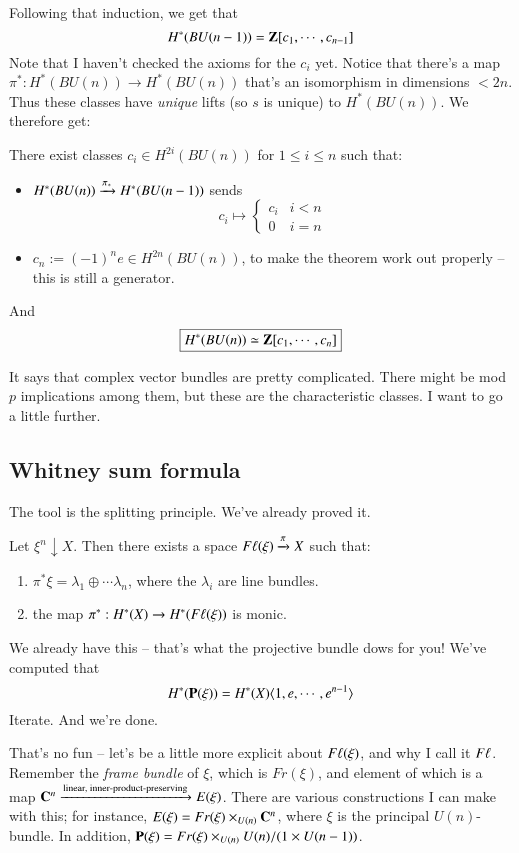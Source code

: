 Following that induction, we get that
$$
H^\ast(BU(n-1)) = \mathbf Z[c_1,\cdots,c_{n-1}]
$$
Note that I haven't checked the axioms for the $c_i$ yet.
Notice that there's a map $\pi^\ast:H^\ast(BU(n)) \to H^\ast(BU(n))$ that's an isomorphism in dimensions $<2n$.
Thus these classes have \emph{unique} lifts (so $s$ is unique) to $H^\ast(BU(n))$.
We therefore get:
\begin{theorem}
    There exist classes $c_i\in H^{2i}(BU(n))$ for $1\leq i\leq n$ such that:
    \begin{itemize}
	\item $H^\ast(BU(n)) \xrightarrow{{\pi_\ast}} H^\ast(BU(n-1))$ sends
	    $$
	    c_i \mapsto \begin{cases}
		c_i & i<n\\
		0 & i=n
	    \end{cases}
	    $$
	\item $c_n := (-1)^n e\in H^{2n}(BU(n))$, to make the theorem work out properly -- this is still a generator.
    \end{itemize}
    And
    $$
    \boxed{H^\ast(BU(n)) \simeq \mathbf Z[c_1,\cdots,c_n]}
    $$
\end{theorem}
It says that complex vector bundles are pretty complicated.
There might be mod $p$ implications among them, but these are the characteristic classes.
I want to go a little further.
\subsection{Whitney sum formula}
The tool is the splitting principle.
We've already proved it.
\begin{theorem}
    Let $\xi^n\downarrow X$.
    Then there exists a space $F\ell(\xi) \xrightarrow{{\pi}} X$ such that:
    \begin{enumerate}
	\item $\pi^\ast \xi = \lambda_1\oplus\cdots\lambda_n$, where the $\lambda_i$ are line bundles.
	\item the map $\pi^\ast: H^\ast(X) \to H^\ast(F\ell(\xi))$ is monic.
    \end{enumerate}
\end{theorem}
We already have this -- that's what the projective bundle dows for you!
We've computed that
$$
H^\ast(\mathbf P(\xi)) = H^\ast(X)\langle 1,e,\cdots,e^{n-1}\rangle
$$
Iterate.
And we're done.

That's no fun -- let's be a little more explicit about $F\ell(\xi)$, and why I call it $F\ell$.
Remember the \emph{frame bundle} of $\xi$, which is $Fr(\xi)$, and element of which is a map $\mathbf C^n\xrightarrow{{\text{linear, inner-product-preserving}}}E(\xi)$.
There are various constructions I can make with this; for instance, $E(\xi) = Fr(\xi)\times_{U(n)}\mathbf C^n$, where $\xi$ is the principal $U(n)$-bundle.
In addition, $\mathbf P(\xi) = Fr(\xi)\times_{U(n)} U(n)/(1\times U(n-1))$.

